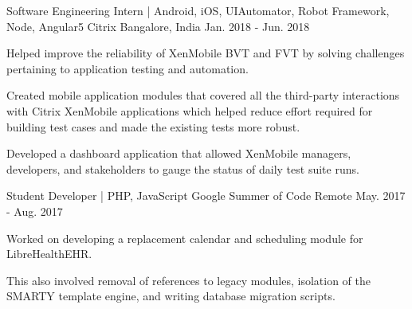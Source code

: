 

\begin{cventries}

  \cventry
    {Software Engineering Intern | Android, iOS, UIAutomator, Robot Framework, Node, Angular5} %
    {Citrix} %
    {Bangalore, India} %
    {Jan. 2018 - Jun. 2018} %
    {
      \begin{cvitems} %
      	\item {Helped improve the reliability of XenMobile BVT and FVT by solving challenges pertaining to application testing and automation.}
      	\item {Created mobile application modules that covered all the third-party interactions with Citrix XenMobile applications which helped reduce effort required for building test cases and made the existing tests more robust. }
        \item {Developed a dashboard application that allowed XenMobile managers, developers, and stakeholders to gauge the status of daily test suite runs.}
      \end{cvitems}
    }

  \cventry
    {Student Developer | PHP, JavaScript} %
    {Google Summer of Code} %
    {Remote} %
    {May. 2017 - Aug. 2017} %
    {
      \begin{cvitems} %
        \item {Worked on developing a replacement calendar and scheduling module for LibreHealthEHR.}
        \item {This also involved removal of references to legacy modules, isolation of the SMARTY template engine, and writing database migration scripts.}
      \end{cvitems}
    }


\end{cventries}
